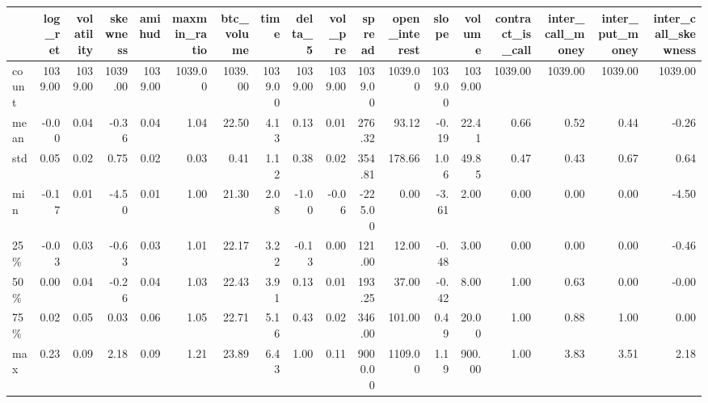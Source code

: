 \begin{tabular}{lrrrrrrrrrrrrrrrrr}
\toprule
{} &  log\_ret &  volatility &  skewness &  amihud &  maxmin\_ratio &  btc\_volume &    time &  delta\_5 &  vol\_pre &  spread &  open\_interest &   slope &  volume &  contract\_is\_call &  inter\_call\_money &  inter\_put\_money &  inter\_call\_skewness \\
\midrule
count &  1039.00 &     1039.00 &   1039.00 & 1039.00 &       1039.00 &     1039.00 & 1039.00 &  1039.00 &  1039.00 & 1039.00 &        1039.00 & 1039.00 & 1039.00 &           1039.00 &           1039.00 &          1039.00 &              1039.00 \\
mean  &    -0.00 &        0.04 &     -0.36 &    0.04 &          1.04 &       22.50 &    4.13 &     0.13 &     0.01 &  276.32 &          93.12 &   -0.19 &   22.41 &              0.66 &              0.52 &             0.44 &                -0.26 \\
std   &     0.05 &        0.02 &      0.75 &    0.02 &          0.03 &        0.41 &    1.12 &     0.38 &     0.02 &  354.81 &         178.66 &    1.06 &   49.85 &              0.47 &              0.43 &             0.67 &                 0.64 \\
min   &    -0.17 &        0.01 &     -4.50 &    0.01 &          1.00 &       21.30 &    2.08 &    -1.00 &    -0.06 & -225.00 &           0.00 &   -3.61 &    2.00 &              0.00 &              0.00 &             0.00 &                -4.50 \\
25\%   &    -0.03 &        0.03 &     -0.63 &    0.03 &          1.01 &       22.17 &    3.22 &    -0.13 &     0.00 &  121.00 &          12.00 &   -0.48 &    3.00 &              0.00 &              0.00 &             0.00 &                -0.46 \\
50\%   &     0.00 &        0.04 &     -0.26 &    0.04 &          1.03 &       22.43 &    3.91 &     0.13 &     0.01 &  193.25 &          37.00 &   -0.42 &    8.00 &              1.00 &              0.63 &             0.00 &                -0.00 \\
75\%   &     0.02 &        0.05 &      0.03 &    0.06 &          1.05 &       22.71 &    5.16 &     0.43 &     0.02 &  346.00 &         101.00 &    0.49 &   20.00 &              1.00 &              0.88 &             1.00 &                 0.00 \\
max   &     0.23 &        0.09 &      2.18 &    0.09 &          1.21 &       23.89 &    6.43 &     1.00 &     0.11 & 9000.00 &        1109.00 &    1.19 &  900.00 &              1.00 &              3.83 &             3.51 &                 2.18 \\
\bottomrule
\end{tabular}
